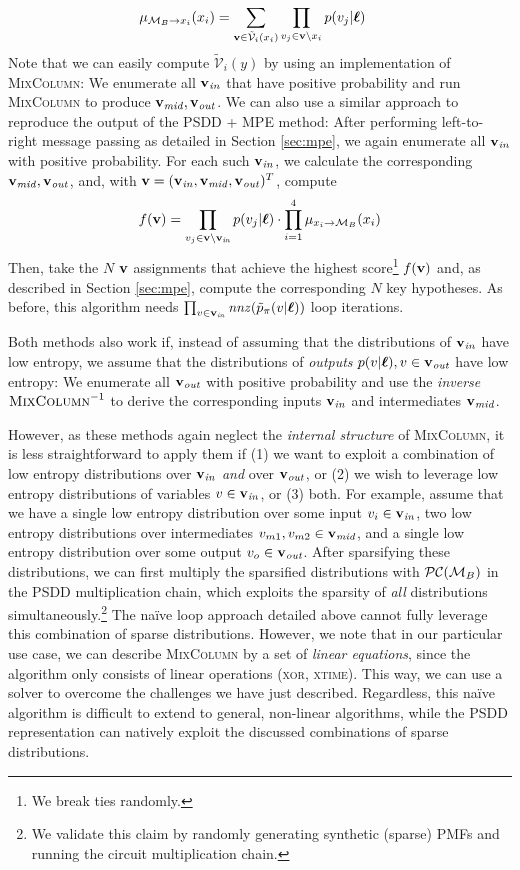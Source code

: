 \begin{align}
    \mu_{\mathcal{M}_B \to x_i}(x_i) &= \sum_{\mathbf{v} \in \tilde{\mathcal{V}}_i(x_i)} \prod_{v_j \in \mathbf{v} \setminus x_i} p(v_j | \boldsymbol{\ell})
\end{align}
Note that we can easily compute $\tilde{\mathcal{V}}_i(y)$ by using an implementation of \textsc{MixColumn}: We enumerate all $\mathbf{v}_{\mathit{in}}$ that have positive probability and run \textsc{MixColumn} to produce $\mathbf{v}_{\mathit{mid}}, \mathbf{v}_{\mathit{out}}$. We can also use a similar approach to reproduce the output of the PSDD + MPE method: After performing left-to-right message passing as detailed in Section \ref{sec:mpe}, we again enumerate all $\mathbf{v}_{\mathit{in}}$ with positive probability. For each such $\mathbf{v}_{\mathit{in}}$, we calculate the corresponding $\mathbf{v}_{\mathit{mid}}, \mathbf{v}_{\mathit{out}}$, and, with $\mathbf{v} = (\mathbf{v}_{\mathit{in}}, \mathbf{v}_{\mathit{mid}}, \mathbf{v}_{\mathit{out}})^T$, compute
\begin{align}
    f(\mathbf{v}) = \prod_{v_j \in \mathbf{v} \setminus \mathbf{v}_{\mathit{in}}} p(v_j | \boldsymbol{\ell}) \cdot \prod_{i=1}^4 \mu_{x_i \to \mathcal{M}_B}(x_i)
\end{align}
Then, take the $N$ $\mathbf{v}$ assignments that achieve the highest score\footnote{We break ties randomly.} $f(\mathbf{v})$ and, as described in Section \ref{sec:mpe}, compute the corresponding $N$ key hypotheses. As before, this algorithm needs $\prod_{v \in \mathbf{v}_{\mathit{in}}} \operatorname{\mathit{nnz}}(\tilde{p}_\pi(v | \boldsymbol{\ell}))$ loop iterations.

Both methods also work if, instead of assuming that the distributions of $\mathbf{v}_{\mathit{in}}$ have low entropy, we assume that the distributions of \emph{outputs} $p(v | \boldsymbol{\ell}), v \in \mathbf{v}_{\mathit{out}}$ have low entropy: We enumerate all $\mathbf{v}_{\mathit{out}}$ with positive probability and use the \emph{inverse} $\textsc{MixColumn}^{-1}$ to derive the corresponding inputs $\mathbf{v}_{\mathit{in}}$ and intermediates $\mathbf{v}_{\mathit{mid}}$.

However, as these methods again neglect the \emph{internal structure} of \textsc{MixColumn}, it is less straightforward to apply them if (1) we want to exploit a combination of low entropy distributions over $\mathbf{v}_{\mathit{in}}$ \emph{and} over $\mathbf{v}_{\mathit{out}}$, or (2) we wish to leverage low entropy distributions of variables $v \in \mathbf{v}_{\mathit{in}}$, or (3) both. For example, assume that we have a single low entropy distribution over some input $v_i \in \mathbf{v}_{\mathit{in}}$, two low entropy distributions over intermediates $v_{m1}, v_{m2} \in \mathbf{v}_{\mathit{mid}}$, and a single low entropy distribution over some output $v_o \in \mathbf{v}_{\mathit{out}}$. After sparsifying these distributions, we can first multiply the sparsified distributions with $\mathcal{PC}(\mathcal{M}_B)$ in the PSDD multiplication chain, which exploits the sparsity of \emph{all} distributions simultaneously.\footnote{We validate this claim by randomly generating synthetic (sparse) PMFs and running the circuit multiplication chain.} The na\"ive loop approach detailed above cannot fully leverage this combination of sparse distributions.
However, we note that in our particular use case, we can describe \textsc{MixColumn} by a set of \emph{linear equations}, since the algorithm only consists of linear operations (\textsc{xor}, \textsc{xtime}). This way, we can use a solver to overcome the challenges we have just described. Regardless, this na\"ive algorithm is difficult to extend to general, non-linear algorithms, while the PSDD representation can natively exploit the discussed combinations of sparse distributions.

